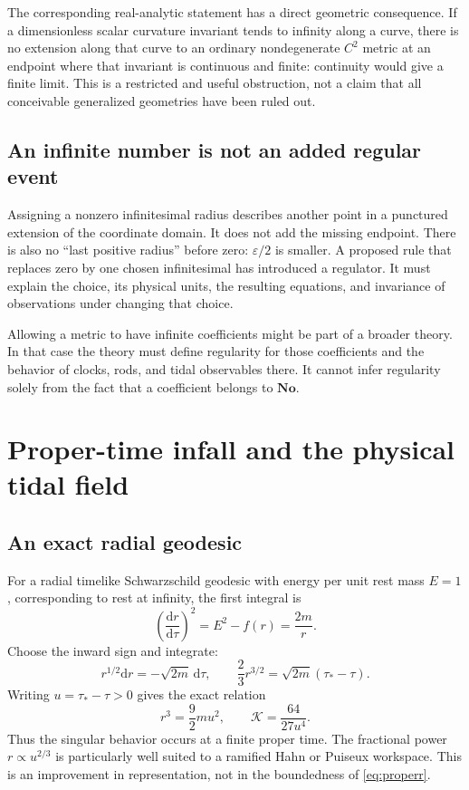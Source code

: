 \documentclass[11pt,a4paper]{article}
\numberwithin{equation}{section}
\theoremstyle{definition}
\theoremstyle{remark}
\newcommand{\No}{\mathbf{No}}
\newcommand{\Kret}{\mathcal K}
\newcommand{\dd}{\mathrm d}
\begin{document}
The corresponding real-analytic statement has a direct geometric consequence.
If a dimensionless scalar curvature invariant tends to infinity along a curve,
there is no extension along that curve to an ordinary nondegenerate $C^2$
metric at an endpoint where that invariant is continuous and finite: continuity
would give a finite limit. This is a restricted and useful obstruction, not a
claim that all conceivable generalized geometries have been ruled out.

\subsection{An infinite number is not an added regular event}
Assigning a nonzero infinitesimal radius describes another point in a punctured
extension of the coordinate domain. It does not add the missing endpoint.
There is also no ``last positive radius'' before zero: $\varepsilon/2$ is
smaller. A proposed rule that replaces zero by one chosen infinitesimal has
introduced a regulator. It must explain the choice, its physical units, the
resulting equations, and invariance of observations under changing that
choice.

Allowing a metric to have infinite coefficients might be part of a broader
theory. In that case the theory must define regularity for those coefficients
and the behavior of clocks, rods, and tidal observables there. It cannot infer
regularity solely from the fact that a coefficient belongs to $\No$.

\section{Proper-time infall and the physical tidal field}\label{sec:infall}

\subsection{An exact radial geodesic}
For a radial timelike Schwarzschild geodesic with energy per unit rest mass
$E=1$, corresponding to rest at infinity, the first integral is
\begin{equation}\label{eq:infall}
\left(\frac{\dd r}{\dd\tau}\right)^2=E^2-f(r)=\frac{2m}{r}.
\end{equation}
Choose the inward sign and integrate:
\[
r^{1/2}\dd r=-\sqrt{2m}\,\dd\tau,
\qquad
\frac23r^{3/2}=\sqrt{2m}(\tau_*-\tau).
\]
Writing $u=\tau_*-\tau>0$ gives the exact relation
\begin{equation}\label{eq:properr}
r^3=\frac92m u^2,
\qquad
\Kret=\frac{64}{27u^4}.
\end{equation}
Thus the singular behavior occurs at a finite proper time. The fractional power
$r\propto u^{2/3}$ is particularly well suited to a ramified Hahn or Puiseux
workspace. This is an improvement in representation, not in the boundedness of
\eqref{eq:properr}.
\end{document}
